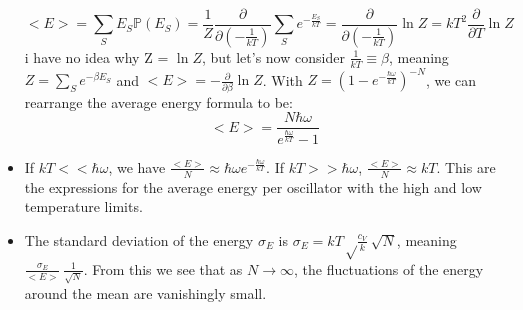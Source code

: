 \documentclass[12pt, letterpaper, twoside]{article}
\begin{document}
\begin{itemize}
    \begin{equation*}
        <E> = \sum_SE_S\mathbb{P}(E_S) = \frac{1}{Z}\frac{\partial}{\partial(-\frac{1}{kT})}\sum_Se^{-\frac{E_S}{kT}} = \frac{\partial}{\partial(-\frac{1}{kT})}\ln{Z} = kT^2\frac{\partial}{\partial T}\ln{Z}
    \end{equation*}
    i have no idea why Z = $\ln Z$, but let's now consider $\frac{1}{kT} \equiv \beta$, meaning $Z = \sum_Se^{-\beta E_S}$ and $<E> = -\frac{\partial}{\partial\beta}\ln{Z}$. With $Z = (1 - e^{-\frac{\hbar\omega}{kT}})^{-N}$, we can rearrange the average energy formula to be:
    \begin{equation}
        <E> = \frac{N\hbar\omega}{e^{\frac{\hbar\omega}{kT}}- 1}
    \end{equation}
    \item If $kT << \hbar\omega$, we have $\frac{<E>}{N} \approx \hbar\omega e^{-\frac{\hbar\omega}{kT}}$. If $kT >> \hbar\omega$, $\frac{<E>}{N} \approx kT$. This are the expressions for the average energy per oscillator with the high and low temperature limits.
    \item The standard deviation of the energy $\sigma_E$ is $\sigma_E = kT\sqrt\frac{c_V}{k} ~ \sqrt{N}$, meaning $\frac{\sigma_E}{<E>} ~ \frac{1}{\sqrt{N}}$. From this we see that as $N \rightarrow \infty$, the fluctuations of the energy around the mean are vanishingly small.
\end{itemize}
\end{document}
